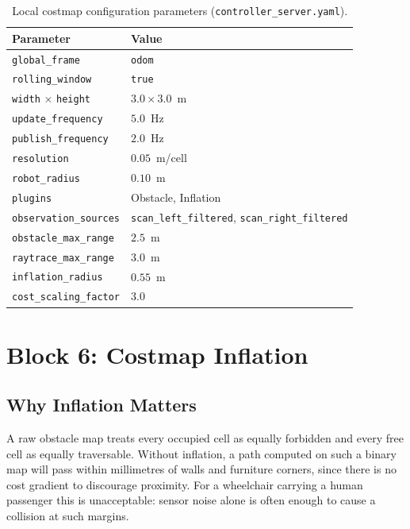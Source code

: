 \begin{table}[H]
\centering
\caption{Local costmap configuration parameters (\texttt{controller\_server.yaml}).}
\label{tab:local_costmap_yaml}
\renewcommand{\arraystretch}{1.2}
\begin{tabular}{ll}
\toprule
\textbf{Parameter} & \textbf{Value} \\
\midrule
\texttt{global\_frame} & \texttt{odom} \\
\texttt{rolling\_window} & \texttt{true} \\
\texttt{width} $\times$ \texttt{height} & $3.0 \times 3.0$~m \\
\texttt{update\_frequency} & $5.0$~Hz \\
\texttt{publish\_frequency} & $2.0$~Hz \\
\texttt{resolution} & $0.05$~m/cell \\
\texttt{robot\_radius} & $0.10$~m \\
\texttt{plugins} & Obstacle, Inflation \\
\texttt{observation\_sources} & \texttt{scan\_left\_filtered}, \texttt{scan\_right\_filtered} \\
\texttt{obstacle\_max\_range} & $2.5$~m \\
\texttt{raytrace\_max\_range} & $3.0$~m \\
\texttt{inflation\_radius} & $0.55$~m \\
\texttt{cost\_scaling\_factor} & $3.0$ \\
\bottomrule
\end{tabular}
\end{table}

\section{Block 6: Costmap Inflation}
\label{sec:costmap}

\subsection*{Why Inflation Matters}

A raw obstacle map treats every occupied cell as equally forbidden and every free cell as equally traversable. Without inflation, a path computed on such a binary map will pass within millimetres of walls and furniture corners, since there is no cost gradient to discourage proximity. For a wheelchair carrying a human passenger this is unacceptable: sensor noise alone is often enough to cause a collision at such margins.

